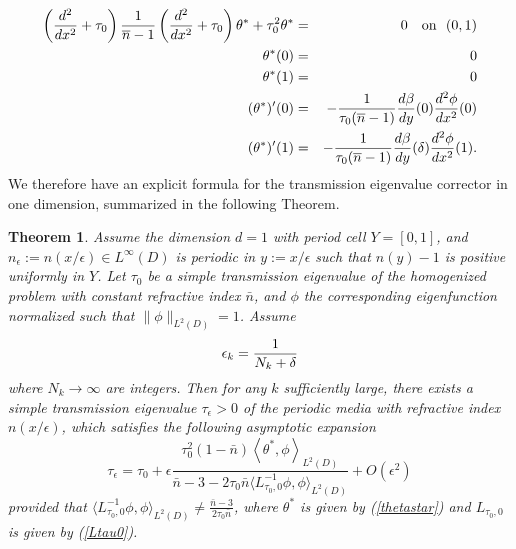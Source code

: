 \documentclass[12pt]{article}
\newtheorem{theorem}{Theorem}
\begin{document}
\begin{eqnarray}   \left({d^2\over{dx^2}}+\tau_0\right) \frac{1}{\overline{n}-1} \left( {d^2\over{dx^2}}+\tau_0\right) \theta^{*} +\tau_0^2\theta^{*} &=&  0 \ \ \ \mbox{on}\ \ (0,1)\label{thetastar} \\ 
\theta^{*}(0) &=& 0  \nonumber \\ \theta^{*}(1) &=& 0  \nonumber \\ (\theta^{*})'(0) &=& -  \frac{1}{\tau_0(\overline{n}-1)}{d\beta\over{d y}}(0) {d^2\phi\over{dx^2}}(0) \nonumber \\  (\theta^{*})'(1) & = &-  \frac{1}{\tau_0(\overline{n}-1)}{d\beta\over{d y}}(\delta) {d^2\phi\over{dx^2}}(1) .\nonumber\end{eqnarray}
We therefore have an explicit formula for the transmission eigenvalue corrector in one dimension, summarized in the following Theorem. 
\begin{theorem}
 Assume the dimension $d=1$ with period cell $Y=[0,1]$, and $n_\epsilon:=n(x/\epsilon)\in L^\infty(D)$ is periodic in $y:=x/\epsilon$ such that $n(y)-1$ is positive uniformly in $Y$. Let $\tau_0$ be a simple transmission eigenvalue of the homogenized problem with constant refractive index $\bar n$, and $\phi$ the corresponding eigenfunction normalized such that $\|\phi\|_{L^2(D)}=1$.  Assume $$\epsilon_k = {1\over{N_k+\delta}}$$  where $N_k\rightarrow\infty$ are integers. Then for any $k$ sufficiently large, there exists a simple transmission eigenvalue $\tau_\epsilon>0$ of the periodic media with refractive index $n(x/\epsilon)$, which satisfies the following asymptotic expansion
 \begin{equation}\label{correctedeig}
 \tau_\epsilon=\tau_0+\epsilon\frac{\tau_0^2(1-\bar n)\left<\theta^{*}, \phi\right>_{L^2(D)}}{\bar n-3-2\tau_0\bar n \langle L^{-1}_{\tau_0,0}\phi,\phi\rangle_{L^2(D)}}+O(\epsilon^2)
 \end{equation} provided that $\langle L^{-1}_{\tau_0,0}\phi,\phi\rangle_{L^2(D)}\neq \frac{\bar n-3}{2\tau_0\bar n}$,  where $\theta^{*}$ is given by (\ref{thetastar}) and $L_{\tau_0,0}$ is given by (\ref{Ltau0}).
\end{theorem}
\end{document}

